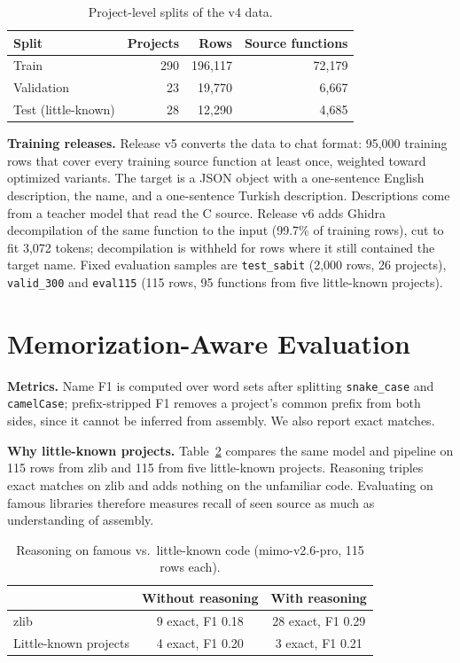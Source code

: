 \documentclass[conference]{IEEEtran}
\begin{document}
\begin{table}[t]
\centering
\caption{Project-level splits of the v4 data.}
\label{tab:splits}
\begin{tabular}{lrrr}
\toprule
Split & Projects & Rows & Source functions \\
\midrule
Train & 290 & 196,117 & 72,179 \\
Validation & 23 & 19,770 & 6,667 \\
Test (little-known) & 28 & 12,290 & 4,685 \\
\bottomrule
\end{tabular}
\end{table}

\textbf{Training releases.} Release v5 converts the data to chat format: 95,000 training rows that cover every training source function at least once, weighted toward optimized variants. The target is a JSON object with a one-sentence English description, the name, and a one-sentence Turkish description. Descriptions come from a teacher model that read the C source. Release v6 adds Ghidra decompilation of the same function to the input (99.7\% of training rows), cut to fit 3,072 tokens; decompilation is withheld for rows where it still contained the target name. Fixed evaluation samples are \texttt{test\_sabit} (2,000 rows, 26 projects), \texttt{valid\_300} and \texttt{eval115} (115 rows, 95 functions from five little-known projects).

\section{Memorization-Aware Evaluation}
\textbf{Metrics.} Name F1 is computed over word sets after splitting \texttt{snake\_case} and \texttt{camelCase}; prefix-stripped F1 removes a project's common prefix from both sides, since it cannot be inferred from assembly. We also report exact matches.

\textbf{Why little-known projects.} Table~\ref{tab:memo} compares the same model and pipeline on 115 rows from zlib and 115 from five little-known projects. Reasoning triples exact matches on zlib and adds nothing on the unfamiliar code. Evaluating on famous libraries therefore measures recall of seen source as much as understanding of assembly.

\begin{table}[t]
\centering
\caption{Reasoning on famous vs.\ little-known code (mimo-v2.6-pro, 115 rows each).}
\label{tab:memo}
\begin{tabular}{lcc}
\toprule
 & Without reasoning & With reasoning \\
\midrule
zlib & 9 exact, F1 0.18 & 28 exact, F1 0.29 \\
Little-known projects & 4 exact, F1 0.20 & 3 exact, F1 0.21 \\
\bottomrule
\end{tabular}
\end{table}
\end{document}
